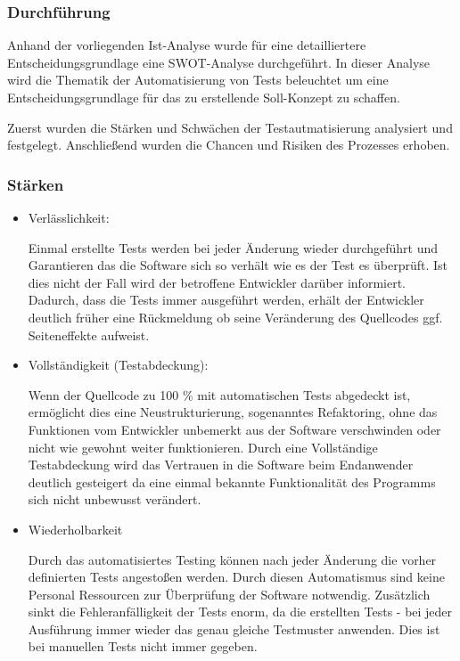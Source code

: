 \subsubsection{Durchführung}
Anhand der vorliegenden Ist-Analyse wurde für eine detailliertere Entscheidungsgrundlage eine SWOT-Analyse durchgeführt. In dieser Analyse wird die Thematik der Automatisierung von Tests beleuchtet um eine Entscheidungsgrundlage für das zu erstellende Soll-Konzept zu schaffen.

Zuerst wurden die Stärken und Schwächen der Testautmatisierung analysiert und festgelegt. Anschließend wurden die Chancen und Risiken des Prozesses erhoben. 
\subsubsection{Stärken}
\begin{itemize}	
	\item Verlässlichkeit:
	
	Einmal erstellte Tests werden bei jeder Änderung wieder durchgeführt und Garantieren das die Software sich so verhält wie es der Test es überprüft. Ist dies nicht der Fall wird der betroffene Entwickler darüber informiert. Dadurch, dass die Tests immer ausgeführt werden, erhält der Entwickler deutlich früher eine Rückmeldung ob seine Veränderung des Quellcodes ggf. Seiteneffekte aufweist.
	
	\item Vollständigkeit (Testabdeckung):
	
	Wenn der Quellcode zu 100 \% mit automatischen Tests abgedeckt ist, ermöglicht dies eine Neustrukturierung, sogenanntes Refaktoring, ohne das Funktionen vom Entwickler unbemerkt aus der Software verschwinden oder nicht wie gewohnt weiter funktionieren. Durch eine Vollständige Testabdeckung wird das Vertrauen in die Software beim Endanwender deutlich gesteigert da eine einmal bekannte Funktionalität des Programms sich nicht unbewusst verändert.
	
	\item Wiederholbarkeit
	
	Durch das automatisiertes Testing können nach jeder Änderung die vorher definierten Tests angestoßen werden. Durch diesen Automatismus sind keine Personal Ressourcen zur Überprüfung der Software notwendig. Zusätzlich sinkt die Fehleranfälligkeit der Tests enorm, da die erstellten Tests - bei jeder Ausführung immer wieder das genau gleiche Testmuster anwenden. Dies ist bei manuellen Tests nicht immer gegeben.
	

\end{itemize}
